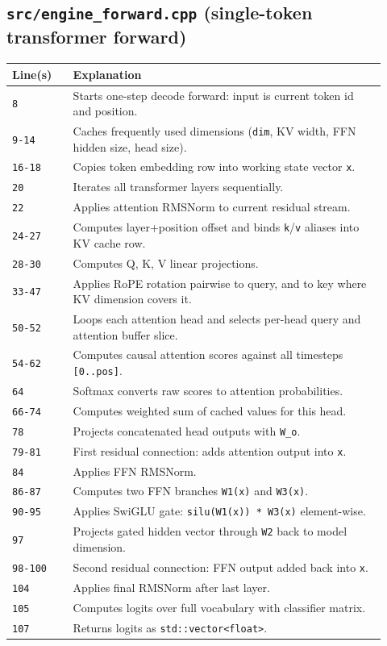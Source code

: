 \documentclass[11pt]{article}
\begin{document}
\subsection{\texttt{src/engine\_forward.cpp} (single-token transformer forward)}
\begin{longtable}{p{0.15\linewidth} p{0.77\linewidth}}
\toprule
\textbf{Line(s)} & \textbf{Explanation} \\
\midrule
\endhead
\texttt{8} & Starts one-step decode forward: input is current token id and position. \\
\texttt{9-14} & Caches frequently used dimensions (\texttt{dim}, KV width, FFN hidden size, head size). \\
\texttt{16-18} & Copies token embedding row into working state vector \texttt{x}. \\
\texttt{20} & Iterates all transformer layers sequentially. \\
\texttt{22} & Applies attention RMSNorm to current residual stream. \\
\texttt{24-27} & Computes layer+position offset and binds \texttt{k}/\texttt{v} aliases into KV cache row. \\
\texttt{28-30} & Computes Q, K, V linear projections. \\
\texttt{33-47} & Applies RoPE rotation pairwise to query, and to key where KV dimension covers it. \\
\texttt{50-52} & Loops each attention head and selects per-head query and attention buffer slice. \\
\texttt{54-62} & Computes causal attention scores against all timesteps \texttt{[0..pos]}. \\
\texttt{64} & Softmax converts raw scores to attention probabilities. \\
\texttt{66-74} & Computes weighted sum of cached values for this head. \\
\texttt{78} & Projects concatenated head outputs with \texttt{W\_o}. \\
\texttt{79-81} & First residual connection: adds attention output into \texttt{x}. \\
\texttt{84} & Applies FFN RMSNorm. \\
\texttt{86-87} & Computes two FFN branches \texttt{W1(x)} and \texttt{W3(x)}. \\
\texttt{90-95} & Applies SwiGLU gate: \texttt{silu(W1(x)) * W3(x)} element-wise. \\
\texttt{97} & Projects gated hidden vector through \texttt{W2} back to model dimension. \\
\texttt{98-100} & Second residual connection: FFN output added back into \texttt{x}. \\
\texttt{104} & Applies final RMSNorm after last layer. \\
\texttt{105} & Computes logits over full vocabulary with classifier matrix. \\
\texttt{107} & Returns logits as \texttt{std::vector<float>}. \\
\bottomrule
\end{longtable}
\end{document}

